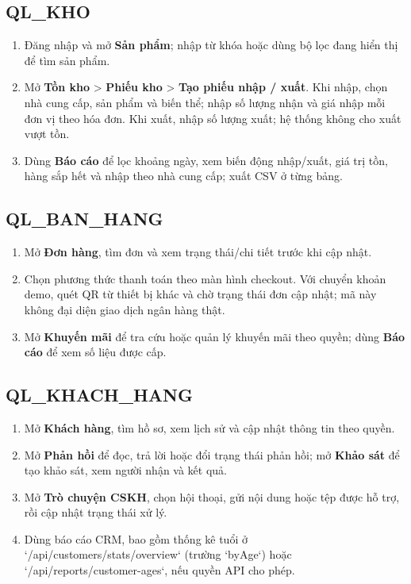 \subsection*{QL\_KHO}
\begin{enumerate}
\item Đăng nhập và mở \textbf{Sản phẩm}; nhập từ khóa hoặc dùng bộ lọc đang hiển thị để tìm sản phẩm.
\item Mở \textbf{Tồn kho} > \textbf{Phiếu kho} > \textbf{Tạo phiếu nhập / xuất}. Khi nhập, chọn nhà cung cấp, sản phẩm và biến thể; nhập số lượng nhận và giá nhập mỗi đơn vị theo hóa đơn. Khi xuất, nhập số lượng xuất; hệ thống không cho xuất vượt tồn.
\item Dùng \textbf{Báo cáo} để lọc khoảng ngày, xem biến động nhập/xuất, giá trị tồn, hàng sắp hết và nhập theo nhà cung cấp; xuất CSV ở từng bảng.
\end{enumerate}

\subsection*{QL\_BAN\_HANG}
\begin{enumerate}
\item Mở \textbf{Đơn hàng}, tìm đơn và xem trạng thái/chi tiết trước khi cập nhật.
\item Chọn phương thức thanh toán theo màn hình checkout. Với chuyển khoản demo, quét QR từ thiết bị khác và chờ trạng thái đơn cập nhật; mã này không đại diện giao dịch ngân hàng thật.
\item Mở \textbf{Khuyến mãi} để tra cứu hoặc quản lý khuyến mãi theo quyền; dùng \textbf{Báo cáo} để xem số liệu được cấp.
\end{enumerate}

\subsection*{QL\_KHACH\_HANG}
\begin{enumerate}
\item Mở \textbf{Khách hàng}, tìm hồ sơ, xem lịch sử và cập nhật thông tin theo quyền.
\item Mở \textbf{Phản hồi} để đọc, trả lời hoặc đổi trạng thái phản hồi; mở \textbf{Khảo sát} để tạo khảo sát, xem người nhận và kết quả.
\item Mở \textbf{Trò chuyện CSKH}, chọn hội thoại, gửi nội dung hoặc tệp được hỗ trợ, rồi cập nhật trạng thái xử lý.
\item Dùng báo cáo CRM, bao gồm thống kê tuổi ở `/api/customers/stats/overview` (trường `byAge`) hoặc `/api/reports/customer-ages`, nếu quyền API cho phép.
\end{enumerate}


